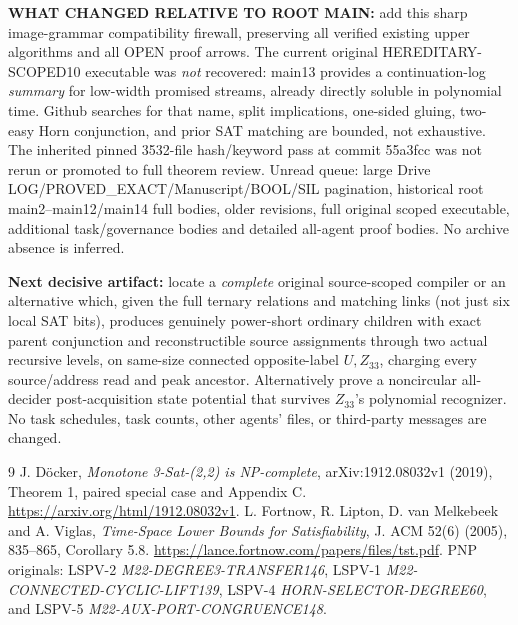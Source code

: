 \documentclass[11pt]{article}
\begin{document}
\noindent\textbf{WHAT CHANGED RELATIVE TO ROOT MAIN:} add this sharp image-grammar compatibility firewall, preserving all verified existing upper algorithms and all OPEN proof arrows. The current original HEREDITARY-SCOPED10 executable was \emph{not} recovered: main13 provides a continuation-log \emph{summary} for low-width promised streams, already directly soluble in polynomial time. Github searches for that name, split implications, one-sided gluing, two-easy Horn conjunction, and prior SAT matching are bounded, not exhaustive. The inherited pinned 3532-file hash/keyword pass at commit 55a3fcc was not rerun or promoted to full theorem review. Unread queue: large Drive LOG/PROVED_EXACT/Manuscript/BOOL/SIL pagination, historical root main2--main12/main14 full bodies, older revisions, full original scoped executable, additional task/governance bodies and detailed all-agent proof bodies. No archive absence is inferred.

\noindent\textbf{Next decisive artifact:} locate a \emph{complete} original source-scoped compiler or an alternative which, given the full ternary relations and matching links (not just six local SAT bits), produces genuinely power-short ordinary children with exact parent conjunction and reconstructible source assignments through two actual recursive levels, on same-size connected opposite-label $U,Z_{33}$, charging every source/address read and peak ancestor. Alternatively prove a noncircular all-decider post-acquisition state potential that survives $Z_{33}$'s polynomial recognizer. No task schedules, task counts, other agents' files, or third-party messages are changed.

\begin{thebibliography}{9}
 J. D\"ocker, \emph{Monotone 3-Sat-(2,2) is NP-complete}, arXiv:1912.08032v1 (2019), Theorem 1, paired special case and Appendix C. \url{https://arxiv.org/html/1912.08032v1}.
 L. Fortnow, R. Lipton, D. van Melkebeek and A. Viglas, \emph{Time-Space Lower Bounds for Satisfiability}, J. ACM 52(6) (2005), 835--865, Corollary 5.8. \url{https://lance.fortnow.com/papers/files/tst.pdf}.
 PNP originals: LSPV-2 \emph{M22-DEGREE3-TRANSFER146}, LSPV-1 \emph{M22-CONNECTED-CYCLIC-LIFT139}, LSPV-4 \emph{HORN-SELECTOR-DEGREE60}, and LSPV-5 \emph{M22-AUX-PORT-CONGRUENCE148}.
\end{thebibliography}
\end{document}
